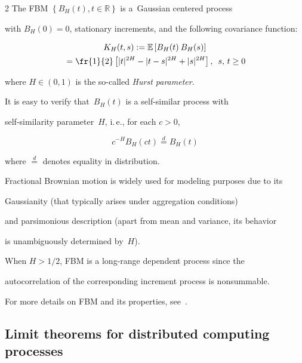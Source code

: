\begin{multicols}{2}
The FBM $\left\{B_H(t), t \in \mathbb{R} \right\}$ is a~Gaussian centered process 

with $B_H(0)=0$, stationary increments, and the following covariance function:

  \begin{multline*}

       K_H(t,s) := \mathbb{E} \left[ B_H(t) \: B_H(s) \right]\\

       {}=

       \fr{1}{2} \left[

       |t|^{2H} - |t-s|^{2H} + |s|^{2H} \right],\enskip s,\,t\ge 0 

     \end{multline*}

where $H \in (0,1)$ is the so-called \textit{Hurst parameter}. 

It is easy to verify that~$B_H(t)$  is a self-similar process with 

self-similarity parameter~$H$, i.\,e., for each $c>0$,

$$

  c^{-H}B_H(ct) \stackrel{d}{=} B_H(t)

$$

where  $\stackrel{d}{=}$  denotes equality in distribution.



Fractional Brownian motion is widely used for modeling purposes due to its 

Gaussianity (that typically arises under aggregation conditions) 

and parsimonious description (apart from mean and variance, its behavior 

is unambiguously determined by~$H$).



When $H>1/2$,  FBM is a long-range dependent process since the

 autocorrelation of the corresponding increment process is nonsummable. 

 For more details on FBM and its properties, see~\cite{13-luk-1}.





\subsection{Limit theorems for distributed computing processes}








\end{multicols}
